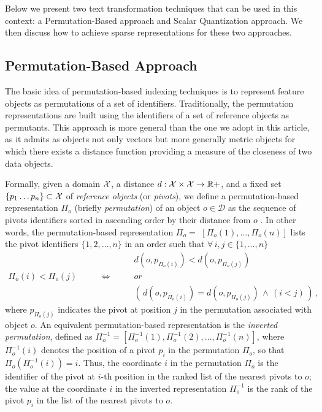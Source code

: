 Below we present two text transformation techniques that can be used in this context: a Permutation-Based approach and Scalar Quantization approach.
We then discuss how to achieve sparse representations for these two approaches.

\subsection{Permutation-Based Approach}
\label{subsec:str:deep-permutations}

The basic idea of permutation-based indexing techniques is to represent feature objects as permutations of a set of identifiers.
Traditionally, the permutation representations are built using the identifiers of a set of reference objects as permutants.
This approach is more general than the one we adopt in this article, as it admits as objects not only vectors but more generally metric objects for which there exists a distance function providing a measure of the closeness of two data objects.

Formally, given a domain $\mathcal{X}$, a distance $d:\mathcal{X}\times \mathcal{X}\to \mathbb{R}+$, and a fixed set  $\{p_1\ldots p_n\}\subset\mathcal{X}$ of \emph{reference objects} (or \emph{pivots}), we define a permutation-based representation $\Pi_{o}$ (briefly \emph{permutation}) of an object $o\in \mathcal{D}$ as the sequence of pivots identifiers sorted in ascending order by their distance from $o$ \cite{amato2014mi,amato2014some}.
In other words, the permutation-based representation $\Pi_{o}=$ $[\Pi_{o}(1), \ldots , \Pi_{o}(n)]$ lists the pivot identifiers $\{1, 2, \ldots, n\}$ in an order such that $\forall\, i,j \in \{1,\ldots, n\}$
\begin{equation}
\begin{matrix}
& & d(o,p_{\Pi_{o}(i)}) <    d(o,p_{\Pi_{o}(j)})\, \\
\Pi_{o}(i)< \Pi_{o}(j)\qquad &\Leftrightarrow\qquad & or \\
& &\left(\, d(o,p_{\Pi_{o}(i)}) =    d(o,p_{\Pi_{o}(j)})\, \wedge\, (i<j)\, \right) \,,
\end{matrix}
\end{equation}
where $p_{\Pi_o(j)}$ indicates the pivot at position $j$ in the permutation associated with object $o$.
An equivalent permutation-based representation is the \emph{inverted permutation}, defined as  $\Pi^{-1}_{o}=[\Pi_{o}^{-1}(1), \Pi_{o}^{-1}(2),\dots , \Pi_{o}^{-1}(n)]$, where $\Pi_{o}^{-1}(i)$ denotes the position of a pivot $p_i$ in the permutation $\Pi_{o}$, so that $\Pi_o(\Pi_o^{-1}(i))=i$.
Thus, the coordinate $i$ in the permutation $\Pi_{o}$ is the identifier of the pivot at $i$-th position in the ranked list of the nearest pivots to $o$;
the value at the coordinate $i$ in the inverted representation $\Pi^{-1}_{o}$ is the rank of the pivot $p_i$ in the list of the nearest pivots to $o$.

